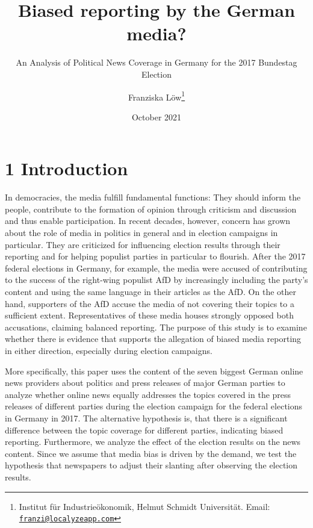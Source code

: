 \documentclass[
  12pt,
]{article}
\title{Biased reporting by the German media?}
\subtitle{An Analysis of Political News Coverage in Germany for the 2017
Bundestag Election}
\author{Franziska Löw\footnote{Institut für Industrieökonomik, Helmut
  Schmidt Universität. Email:
  \href{mailto:franzi@localyzeapp.com}{\nolinkurl{franzi@localyzeapp.com}}}}
\date{October 2021}
\begin{document}
\maketitle

\pagebreak
\tableofcontents
\pagebreak

\listoftables
\pagebreak

\listoffigures
\pagebreak

\hypertarget{introduction}{%
\section{1 Introduction}\label{introduction}}

In democracies, the media fulfill fundamental functions: They should
inform the people, contribute to the formation of opinion through
criticism and discussion and thus enable participation. In recent
decades, however, concern has grown about the role of media in politics
in general and in election campaigns in particular. They are criticized
for influencing election results through their reporting and for helping
populist parties in particular to flourish. After the 2017 federal
elections in Germany, for example, the media were accused of
contributing to the success of the right-wing populist AfD by
increasingly including the party's content and using the same language
in their articles as the AfD. On the other hand, supporters of the AfD
accuse the media of not covering their topics to a sufficient extent.
Representatives of these media houses strongly opposed both accusations,
claiming balanced reporting. The purpose of this study is to examine
whether there is evidence that supports the allegation of biased media
reporting in either direction, especially during election campaigns.

More specifically, this paper uses the content of the seven biggest
German online news providers about politics and press releases of major
German parties to analyze whether online news equally addresses the
topics covered in the press releases of different parties during the
election campaign for the federal elections in Germany in 2017. The
alternative hypothesis is, that there is a significant difference
between the topic coverage for different parties, indicating biased
reporting. Furthermore, we analyze the effect of the election results on
the news content. Since we assume that media bias is driven by the
demand, we test the hypothesis that newspapers to adjust their slanting
after observing the election results.
\end{document}
